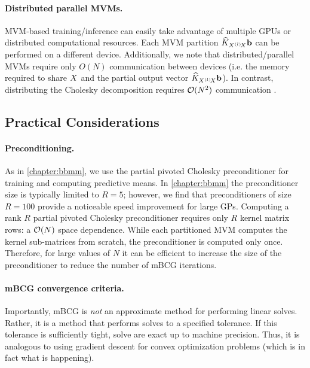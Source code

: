 \paragraph{Distributed parallel MVMs.}
MVM-based training/inference can easily take advantage of multiple GPUs or distributed computational resources.
Each MVM partition $\widehat {K}_{X^{(l)}\!X} \mathbf{b}$ can be performed on a different device.
Additionally, we note that distributed/parallel MVMs require only $O(N)$ communication between devices (i.e. the memory required to share $X$ and the partial output vector $\widehat {K}_{X^{(l)}\!X} \mathbf{b}$).
In contrast, distributing the Cholesky decomposition requires $\bigo{N^2}$ communication \citep{nguyen2019exact}.






\subsection{Practical Considerations}


\paragraph{Preconditioning.}
As in \cref{chapter:bbmm}, we use the partial pivoted Cholesky preconditioner for training and computing predictive means.
In \cref{chapter:bbmm} the preconditioner size is typically limited to $R=5$; however, we find that preconditioners of size $R=100$ provide a noticeable speed improvement for large GPs.
Computing a rank $R$ partial pivoted Cholesky preconditioner requires only $R$ kernel matrix rows: a $\bigo{N}$ space dependence.
While each partitioned MVM computes the kernel sub-matrices from scratch, the preconditioner is computed only once.
Therefore, for large values of $N$ it can be efficient to increase the size of the preconditioner to reduce the number of mBCG iterations.


\paragraph{mBCG convergence criteria.}
Importantly, mBCG is \emph{not} an approximate method for performing linear solves.
Rather, it is a method that performs solves to a specified tolerance.
If this tolerance is sufficiently tight, solve are exact up to machine precision.
Thus, it is analogous to using gradient descent for convex optimization problems (which is in fact what is happening).

